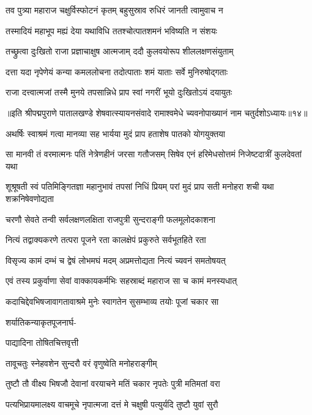 \twolineshloka
{तव पुत्र्या महाराज चक्षुर्विस्फोटनं कृतम्}
{बहुसुस्राव रुधिरं जानती त्वामुवाच न}%

\twolineshloka
{तस्मादियं महाभूप मह्यं देया यथाविधि}
{ततश्चोत्पातशमनं भविष्यति न संशयः}%

\twolineshloka
{तच्छ्रुत्वा दुःखितो राजा प्रज्ञाचाक्षुष आत्मजाम्}
{ददौ कुलवयोरूप शीललक्षणसंयुताम्}%

\twolineshloka
{दत्ता यदा नृपेणेयं कन्या कमललोचना}
{तदोत्पाताः शमं याताः सर्वे मुनिरुषोद्गताः}%

\twolineshloka
{राजा दत्त्वात्मजां तस्मै मुनये तपसान्निधे}
{प्राप स्वां नगरीं भूयो दुःखितोऽयं दयायुतः}%

॥इति श्रीपद्मपुराणे पातालखण्डे शेषवात्स्यायनसंवादे रामाश्वमेधे च्यवनोपाख्यानं नाम चतुर्दशोऽध्यायः॥१४॥



\twolineshloka
{अथर्षिः स्वाश्रमं गत्वा मानव्या सह भार्यया}
{मुदं प्राप हताशेष पातको योगयुक्तया}%

\fourlineindentedshloka
{सा मानवी तं वरमात्मनः पतिं}
{नेत्रेणहीनं जरसा गतौजसम्}
{सिषेव एनं हरिमेधसोत्तमं}
{निजेष्टदात्रीं कुलदेवतां यथा}%

\fourlineindentedshloka
{शूश्रूषती स्वं पतिमिङ्गितज्ञा}
{महानुभावं तपसां निधिं प्रियम्}
{परां मुदं प्राप सती मनोहरा}
{शची यथा शक्रनिषेवणोद्यता}%

\twolineshloka
{चरणौ सेवते तन्वी सर्वलक्षणलक्षिता}
{राजपुत्री सुन्दराङ्गी फलमूलोदकाशना}%

\twolineshloka
{नित्यं तद्वाक्यकरणे तत्परा पूजने रता}
{कालक्षेपं प्रकुरुते सर्वभूतहिते रता}%

\twolineshloka
{विसृज्य कामं दम्भं च द्वेषं लोभमघं मदम्}
{अप्रमत्तोद्यता नित्यं च्यवनं समतोषयत्}%

\twolineshloka
{एवं तस्य प्रकुर्वाणा सेवां वाक्कायकर्मभिः}
{सहस्राब्दं महाराज सा च कामं मनस्यधात्}%

\twolineshloka
{कदाचिद्देवभिषजावागतावाश्रमे मुनेः}
{स्वागतेन सुसम्भाव्य तयोः पूजां चकार सा}%

शर्यातिकन्याकृतपूजनार्घ-

पाद्यादिना तोषितचित्तवृत्ती

\twolineshloka
{तावूचतुः स्नेहवशेन सुन्दरौ}
{वरं वृणुष्वेति मनोहराङ्गीम्}%

\twolineshloka
{तुष्टौ तौ वीक्ष्य भिषजौ देवानां वरयाचने}
{मतिं चकार नृपतेः पुत्री मतिमतां वरा}%

\twolineshloka
{पत्यभिप्रायमालक्ष्य वाचमूचे नृपात्मजा}
{दत्तं मे चक्षुषी पत्युर्यदि तुष्टौ युवां सुरौ}%

